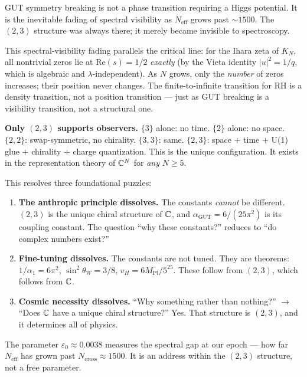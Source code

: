GUT symmetry breaking is not a phase transition requiring a Higgs potential. It is the inevitable fading of spectral visibility as $N_\text{eff}$ grows past $\sim 1500$. The $(2,3)$ structure was always there; it merely became invisible to spectroscopy.

\begin{remark}
This spectral-visibility fading parallels the critical line:
for the Ihara zeta of $K_N$, all nontrivial zeros lie at
$\mathrm{Re}(s) = 1/2$ \emph{exactly} (by the Vieta identity
$|u|^2 = 1/q$, which is algebraic and $\lambda$-independent).
As $N$ grows, only the \emph{number} of zeros increases;
their position never changes.  The finite-to-infinite
transition for RH is a density transition, not a position
transition --- just as GUT breaking is a visibility transition,
not a structural one.
\end{remark}

\textbf{Only $(2,3)$ supports observers.} $\{3\}$ alone: no time. $\{2\}$ alone: no space. $\{2,2\}$: swap-symmetric, no chirality. $\{3,3\}$: same. $\{2,3\}$: space $+$ time $+$ U(1) glue $+$ chirality $+$ charge quantization. This is the unique configuration. It exists in the representation theory of $\mathbb{C}^N$ for \emph{any} $N \geq 5$.

This resolves three foundational puzzles:

\begin{enumerate}
\item \textbf{The anthropic principle dissolves.} The constants \emph{cannot} be different. $(2,3)$ is the unique chiral structure of $\mathbb{C}$, and $\alpha_\text{GUT} = 6/(25\pi^2)$ is its coupling constant. The question ``why these constants?'' reduces to ``do complex numbers exist?''

\item \textbf{Fine-tuning dissolves.} The constants are not tuned. They are theorems: $1/\alpha_1 = 6\pi^2$, $\sin^2\theta_W = 3/8$, $v_H = 6M_\text{Pl}/5^{25}$. These follow from $(2,3)$, which follows from $\mathbb{C}$.

\item \textbf{Cosmic necessity dissolves.} ``Why something rather than nothing?'' $\to$ ``Does $\mathbb{C}$ have a unique chiral structure?'' Yes. That structure is $(2,3)$, and it determines all of physics.
\end{enumerate}

The parameter $\varepsilon_0 \approx 0.0038$ measures the spectral gap at our epoch --- how far $N_\text{eff}$ has grown past $N_\text{cross} \approx 1500$. It is an address within the $(2,3)$ structure, not a free parameter.

